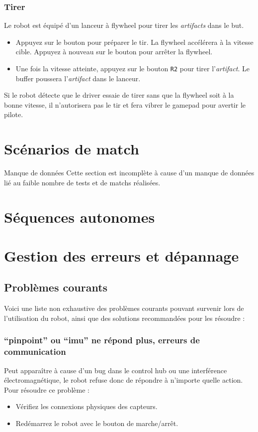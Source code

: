 \documentclass[12pt, a4paper]{report}
\begin{document}
    \subsubsection{Tirer}

    Le robot est équipé d'un lanceur à flywheel pour tirer les \textit{artifacts} dans le but.

    \begin{itemize}
        \item Appuyez sur le bouton \textttt{$\square$} pour préparer le tir. La flywheel accélérera à la vitesse cible. Appuyez à nouveau sur le bouton pour arrêter la flywheel.
        \item Une fois la vitesse atteinte, appuyez sur le bouton \texttt{R2} pour tirer l'\textit{artifact}. Le buffer poussera l'\textit{artifact} dans le lanceur.
    \end{itemize}

    Si le robot détecte que le driver essaie de tirer sans que la flywheel soit à la bonne vitesse, il n'autorisera pas le tir et fera vibrer le gamepad pour avertir le pilote.


    \section{Scénarios de match}

    \begin{myinfo}{Manque de données}
        Cette section est incomplète à cause d'un manque de données lié au faible nombre de tests et de matchs réalisées.
    \end{myinfo}


    \section{Séquences autonomes}


    \section{Gestion des erreurs et dépannage}

    \subsection{Problèmes courants}
    Voici une liste non exhaustive des problèmes courants pouvant survenir lors de l'utilisation du robot, ainsi que des solutions recommandées pour les résoudre :

    \subsubsection{\enquote{pinpoint} ou \enquote{imu} ne répond plus, erreurs de communication}
    Peut apparaître à cause d'un bug dans le control hub ou une interférence électromagnétique, le robot refuse donc de répondre à n'importe quelle action. Pour résoudre ce problème :
    \begin{itemize}
        \item Vérifiez les connexions physiques des capteurs.
        \item Redémarrez le robot avec le bouton de marche/arrêt.
    \end{itemize}
\end{document}
